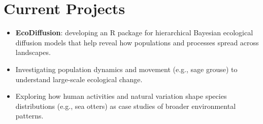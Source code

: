 \section*{Current Projects}
\begin{itemize}
  \item \textbf{EcoDiffusion}: developing an R package for hierarchical Bayesian ecological diffusion models that help reveal how populations and processes spread across landscapes.
  \item Investigating population dynamics and movement (e.g., sage grouse) to understand large-scale ecological change.
  \item Exploring how human activities and natural variation shape species distributions (e.g., sea otters) as case studies of broader environmental patterns.
\end{itemize}
